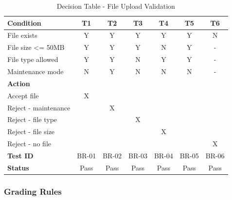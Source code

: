 \documentclass[12pt,a4paper]{article}
\begin{document}
    \begin{table}[H]
        \caption{Decision Table - File Upload Validation}
        \begin{tabular}{|l|c|c|c|c|c|c|}
            \hline
            \textbf{Condition} & \textbf{T1} & \textbf{T2} & \textbf{T3} & \textbf{T4} & \textbf{T5} & \textbf{T6} \\
            \hline
            File exists & Y & Y & Y & Y & Y & N \\
            File size <= 50MB & Y & Y & Y & N & Y & - \\
            File type allowed & Y & Y & N & Y & Y & - \\
            Maintenance mode & N & Y & N & N & N & - \\
            \hline
            \textbf{Action} & & & & & & \\
            \hline
            Accept file & X & & & & & \\
            Reject - maintenance & & X & & & & \\
            Reject - file type & & & X & & & \\
            Reject - file size & & & & X & & \\
            Reject - no file & & & & & & X \\
            \hline
            \textbf{Test ID} & BR-01 & BR-02 & BR-03 & BR-04 & BR-05 & BR-06 \\
            \textbf{Status} & Pass & Pass & Pass & Pass & Pass & Pass \\
            \hline
        \end{tabular}
    \end{table}

    \subsubsection{Grading Rules}
\end{document}
